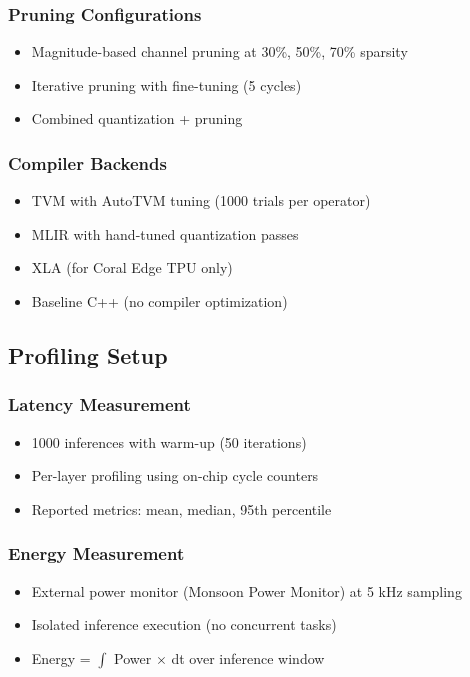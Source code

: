 \subsubsection{Pruning Configurations}
\begin{itemize}
\item Magnitude-based channel pruning at 30\%, 50\%, 70\% sparsity
\item Iterative pruning with fine-tuning (5 cycles)
\item Combined quantization + pruning
\end{itemize}

\subsubsection{Compiler Backends}
\begin{itemize}
\item TVM with AutoTVM tuning (1000 trials per operator)
\item MLIR with hand-tuned quantization passes
\item XLA (for Coral Edge TPU only)
\item Baseline C++ (no compiler optimization)
\end{itemize}

\subsection{Profiling Setup}

\subsubsection{Latency Measurement}
\begin{itemize}
\item 1000 inferences with warm-up (50 iterations)
\item Per-layer profiling using on-chip cycle counters
\item Reported metrics: mean, median, 95th percentile
\end{itemize}

\subsubsection{Energy Measurement}
\begin{itemize}
\item External power monitor (Monsoon Power Monitor) at 5 kHz sampling
\item Isolated inference execution (no concurrent tasks)
\item Energy = $\int$ Power $\times$ dt over inference window
\end{itemize}

